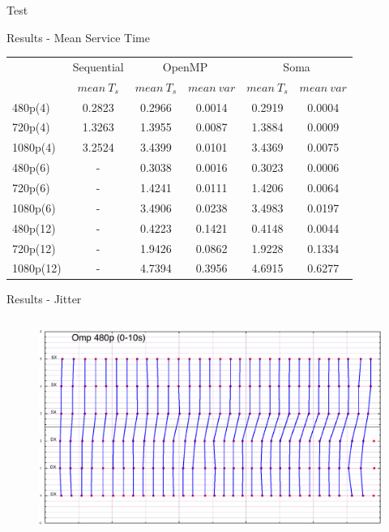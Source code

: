\documentclass[xcolor=dvipsnames]{beamer}
\begin{document}
\begin{section}{Test}
\begin{frame}{\hskip 0.3cm Results - Mean Service Time}
\begin{center}
{\begin{tabular}{| l || c || c | c || c | c |}
\hline
 & \multicolumn{1}{|c||}{Sequential} & \multicolumn{2}{|c||}{OpenMP} & \multicolumn{2}{|c|}{Soma} \\
\cline{2-6}
  & $mean\ T_s$ & $mean\ T_s$ & $mean\ var$ & $mean\ T_s$ & $mean\ var$ \\
\cline{2-6}
\hline
480p(4) & 0.2823 & 0.2966 & 0.0014 & 0.2919 & 0.0004 \\
\hline
720p(4) & 1.3263 & 1.3955 & 0.0087 & 1.3884 & 0.0009 \\
\hline
1080p(4) & 3.2524 & 3.4399 & 0.0101 & 3.4369 & 0.0075 \\
\hline 
\hline
480p(6) & - & 0.3038 & 0.0016 & 0.3023 & 0.0006 \\
\hline
720p(6) & - & 1.4241 & 0.0111 & 1.4206 & 0.0064 \\
\hline
1080p(6) & - & 3.4906 & 0.0238 & 3.4983 & 0.0197 \\
\hline 
\hline
480p(12) & - & 0.4223 & 0.1421 & 0.4148 & 0.0044 \\
\hline
720p(12) & - & 1.9426 & 0.0862 & 1.9228 & 0.1334 \\
\hline
1080p(12) & - & 4.7394 & 0.3956 & 4.6915 & 0.6277 \\
\hline 
\end{tabular} }
\end{center}







\end{frame}













\begin{frame}{\hskip 0.3cm Results - Jitter}

\begin{columns}
\begin{column}{6.5cm}
\vskip -1cm
\begin{figure}

\includegraphics[scale=0.14]{omp_480_range_010.png}
\end{figure}


\end{column}
\end{columns}
\end{frame}
\end{section}
\end{document}
